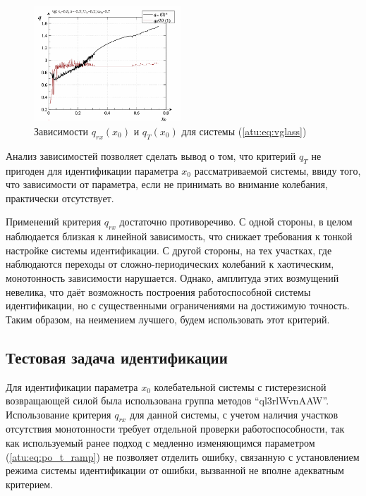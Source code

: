 \begin{figure}[ht!]
\begin{center}
  \includegraphics[width=0.49\textwidth]{p/cha/vg/vg_q1-p_q.png}
\end{center}
  \caption{Зависимости $q_{rx}(x_0)$ и $q_T(x_0)$ для системы (\ref{atu:eq:vglass})}
\label{atu:f:vglass_q}
\end{figure}

Анализ зависимостей позволяет сделать вывод о том, что критерий $q_T$
не пригоден для идентификации параметра $x_0$
рассматриваемой системы, ввиду того,
что зависимости от параметра, если не принимать во внимание колебания,
практически отсутствует.

Применений критерия $q_{rx}$ достаточно противоречиво.
С одной стороны, в целом наблюдается близкая к линейной зависимость,
что снижает требования к тонкой настройке системы идентификации.
С другой стороны, на тех участках,
где наблюдаются переходы от сложно-периодических колебаний
к хаотическим, монотонность зависимости нарушается.
Однако, амплитуда этих возмущений невелика,
что даёт возможность построения работоспособной системы идентификации,
но с существенными ограничениями на достижимую точность.
Таким образом, на неимением лучшего, будем использовать этот критерий.




\subsection{Тестовая задача идентификации}  %

Для идентификации параметра $x_0$
колебательной системы с гистерезисной возвращающей силой
была использована группа методов  ``ql3rlWvnAAW''.
Использование критерия $q_{rx}$ для данной системы,
с учетом наличия участков отсутствия монотонности
требует отдельной проверки работоспособности,
так как используемый ранее подход с
медленно изменяющимся параметром (\ref{atu:eq:po_t_ramp}) не позволяет
отделить ошибку, связанную с установлением режима системы идентификации
от ошибки, вызванной не вполне адекватным критерием.

